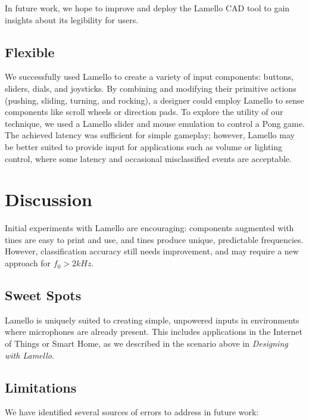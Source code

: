     In future work, we hope to improve and deploy the Lamello CAD tool to gain insights about its legibility for users.

    \subsection{Flexible}
    We successfully used Lamello to create a variety of input components: buttons, sliders, dials, and joysticks. By combining and modifying their primitive actions (pushing, sliding, turning, and rocking), a designer could employ Lamello to sense components like scroll wheels or direction pads. 
    To explore the utility of our technique, we used a Lamello slider and mouse emulation to control a Pong game. The achieved latency was sufficient for simple gameplay; however, Lamello may be better suited to provide input for applications such as volume or lighting control, where some latency and occasional misclassified events are acceptable. 

\section{Discussion}

Initial experiments with Lamello are encouraging: components augmented with tines are easy to print and use, and tines produce unique, predictable frequencies. However, classification accuracy still needs improvement, and may require a new approach for $f_0>2kHz$.

    \subsection{Sweet Spots}

    Lamello is uniquely suited to creating simple, unpowered inputs in environments where microphones are already present. This includes applications in the Internet of Things or Smart Home, as we described in the scenario above in \emph{Designing with Lamello}. 
    
    \subsection{Limitations}
    
     We have identified several sources of errors to address in future work:

